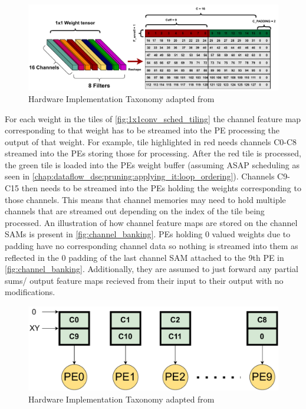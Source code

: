 \begin{figure}[ht]
    \centering
    \includegraphics[scale=0.6]{fig/1x1conv_sched_tiling.pdf}
    \caption{Hardware Implementation Taxonomy adapted from \cite{maestro}}
    \label{fig:1x1conv_sched_tiling}
\end{figure}

For each weight in the tiles of \autoref{fig:1x1conv_sched_tiling} the channel
feature map corresponding to that weight has to be streamed into the PE
processing the output of that weight. For example, tile highlighted in red needs
channels C0-C8 streamed into the PEs storing those for processing. After the red
tile is processed, the green tile is loaded into the PEs weight buffer (assuming
ASAP scheduling as seen in
\autoref{chap:dataflow_dse:pruning:applying_it:loop_ordering}). Channels C9-C15
then needs to be streamed into the PEs holding the weights corresponding to
those channels. This means that channel memories may need to hold multiple
channels that are streamed out depending on the index of the tile being
processed. An illustration of how channel feature maps are stored on the channel
SAMs is present in \autoref{fig:channel_banking}. PEs holding 0 valued weights
due to padding have no corresponding channel data so nothing is streamed into
them as reflected in the 0 padding of the last channel SAM attached to the 9th
PE in \autoref{fig:channel_banking}. Additionally, they are assumed to just
forward any partial sums/ output feature maps recieved from their input to their
output with no modifications.

\begin{figure}[ht]
    \centering
    \includegraphics[scale=0.495]{fig/1x1conv_ifmap_banking.pdf}
    \caption{Hardware Implementation Taxonomy adapted from \cite{maestro}}
    \label{fig:channel_banking}
\end{figure}


